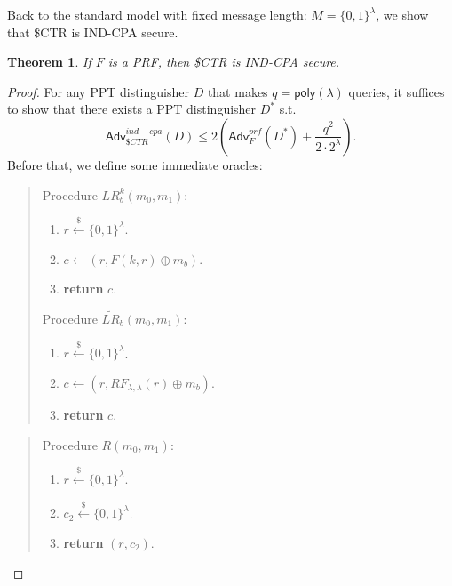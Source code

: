 \documentclass[12pt]{article}
\newcommand{\bits}{\{0,1\}}
\newcommand{\getsr}{\stackrel{\$}{\gets}}
\newcommand{\Adv}{\mathsf{Adv}}
\newcommand{\poly}{\mathsf{poly}}
\newtheorem{theorem}{Theorem}[section]
\theoremstyle{definition}
\begin{document}
Back to the standard model with fixed message length: $M = \bits^\lambda$, we show that \$CTR is IND-CPA secure.
\begin{theorem}
If $F$ is a PRF, then \$CTR is IND-CPA secure.
\end{theorem}
\begin{proof}
For any PPT distinguisher $D$ that makes $q = \poly(\lambda)$ queries, it suffices to show that there exists a PPT distinguisher $D^*$ s.t.
$$\Adv_{\$CTR}^{ind-cpa}(D) \leq 2 \left(\Adv_{F}^{prf}(D^*) + \frac{q^2}{2\cdot 2^\lambda}\right).$$
Before that, we define some immediate oracles:

\begin{quote}
\centering
\begin{minipage}{.4\textwidth}
Procedure $LR_b^k(m_0, m_1)$:
\begin{enumerate}
\item $r \getsr \bits^\lambda$.
\item $c \gets (r, F(k, r) \oplus m_b)$.
\item {\bf return} $c$.
\end{enumerate}
\end{minipage}
\hspace{.1in}
\begin{minipage}{.4\textwidth}
Procedure $\widetilde{LR}_b(m_0, m_1)$:
\begin{enumerate}
\item $r \getsr \bits^\lambda$.
\item $c \gets (r, RF_{\lambda,\lambda}(r) \oplus m_b)$.
\item {\bf return} $c$.
\end{enumerate}
\end{minipage}
\end{quote}
\begin{quote}
\centering
\begin{minipage}{.4\textwidth}
Procedure $R(m_0, m_1)$:
\begin{enumerate}
\item $r \getsr \bits^\lambda$.
\item $c_2 \getsr \bits^\lambda$.
\item {\bf return} $(r, c_2)$.
\end{enumerate}
\end{minipage}
\end{quote}


\end{proof}
\end{document}
